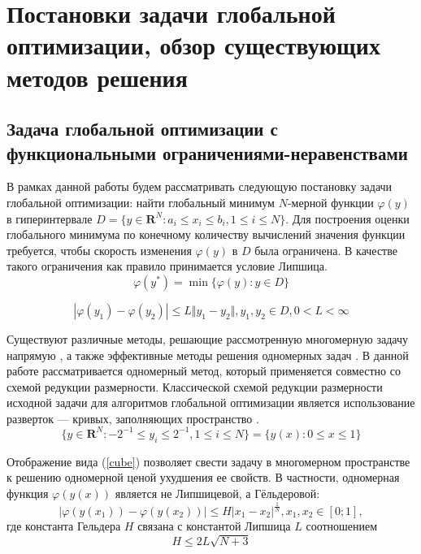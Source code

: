 \section{Постановки задачи глобальной оптимизации, обзор существующих методов решения}

\subsection{Задача глобальной оптимизации с функциональными ограничениями-неравенствами}
В рамках данной работы будем рассматривать следующую постановку задачи глобальной
оптимизации: найти глобальный минимум \(N\)-мерной функции \(\varphi(y)\) в гиперинтервале
\(D=\{y\in \mathbf{R}^N:a_i\leqslant x_i\leqslant{b_i}, 1\leqslant{i}\leqslant{N}\}\).
Для построения оценки глобального минимума по конечному количеству вычислений
значения функции требуется, чтобы скорость изменения \(\varphi(y)\) в \(D\) была ограничена.
В качестве такого ограничения как правило принимается условие Липшица.
\begin{equation}
\label{eq:task}
\varphi(y^*)=\min\{\varphi(y):y\in D\}
\end{equation}

\begin{equation}
\label{eq:lip}
|\varphi(y_1)-\varphi(y_2)|\leqslant L\Vert y_1-y_2\Vert,y_1,y_2\in D,0<L<\infty
\end{equation}

Существуют различные методы, решающие рассмотренную многомерную задачу напрямую \cite{SergeyevKvasov2017, Jones2009},
а также эффективные методы решения одномерных задач \cite{Norkin1992, Strongin2000}. В данной работе рассматривается одномерный метод,
который применяется совместно со схемой редукции размерности.
Классической схемой редукции размерности исходной задачи для алгоритмов глобальной оптимизации является
использование разверток --- кривых, заполняющих пространство \cite{Sergeyev2013}.
\begin{equation}
\label{cube}
\lbrace y\in \mathbf{R}^N:-2^{-1}\leqslant y_i\leqslant 2^{-1},1\leqslant i\leqslant N\rbrace=\{y(x):0\leqslant x\leqslant 1\}
\end{equation}

Отображение вида (\ref{cube}) позволяет свести задачу в многомерном пространстве к решению
одномерной ценой ухудшения ее свойств. В частности, одномерная функция \(\varphi(y(x))\)
является не Липшицевой, а Гёльдеровой:
\begin{displaymath}
\label{holder}
|\varphi(y(x_1))-\varphi(y(x_2))|\leqslant H{|x_1-x_2|}^{\frac{1}{N}},x_1,x_2\in[0;1],
\end{displaymath}
где константа Гельдера \(H\) связана с константой Липшица \(L\) соотношением
\begin{equation}
  \label{eq:conv_cond}
 H\leqslant 2L\sqrt{N+3}
\end{equation}

